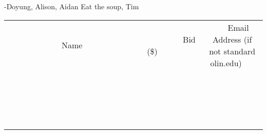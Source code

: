 \documentclass[11pt]{article}
\begin{document}
-Doyung, Alison, Aidan
Eat the soup, Tim
\\[3ex]
\begin{tabular}{c c c}
~~~~~~~~~~~~~Name~~~~~~~~~~~~~ & ~~~~~~~~~Bid (\$)~~~~~~~~~  & ~~~Email Address (if not standard olin.edu)~~~\\
 & & \\
\hline
 & & \\
\hline
 & & \\
\hline
 & & \\
\hline
 & & \\
\hline
 & & \\
\hline
 & & \\
\hline
 & & \\
\hline
 & & \\
\hline
 & & \\
\hline
 & & \\
\hline
 & & \\
\hline
 & & \\
\hline
 & & \\
\hline
 & & \\
\hline
 & & \\
\hline
 & & \\
\hline
 & & \\
\hline
 & & \\
\hline
\end{tabular}
\newpage
\end{document}
